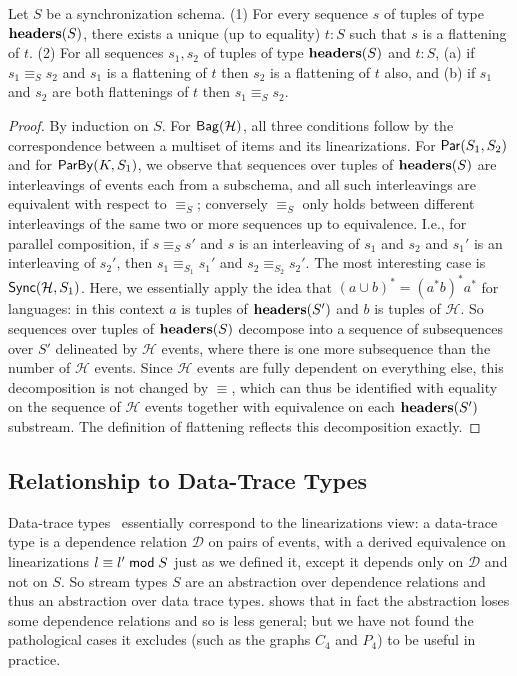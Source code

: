 \begin{proposition}
\label{45:prop:sps-sequence-correspondence}
Let $S$ be a synchronization schema.
(1) For every sequence $s$ of tuples of type $\mathbf{headers}(S)$, there exists a unique (up to equality) $t : S$ such that $s$ is a flattening of $t$.
(2) For all sequences $s_1, s_2$ of tuples of type $\mathbf{headers}(S)$ and $t : S$,
(a) if $s_1 \equiv_{S} s_2$ and $s_1$ is a flattening of  $t$ then $s_2$ is a flattening of $t$ also, and
(b) if $s_1$ and $s_2$ are both flattenings of $t$ then $s_1 \equiv_{S} s_2$.
\end{proposition}
\begin{proof}
By induction on $S$.
For $\mathsf{Bag}({\mathcal{H}})$,
all three conditions follow by the correspondence between a multiset of items and its linearizations.
For $\mathsf{Par}({S_1}, {S_2})$
and for $\mathsf{ParBy}({K}, S_1)$,
we observe that sequences over tuples of $\mathbf{headers}(S)$ are interleavings of events each from a subschema,
and all such interleavings are equivalent with respect to $\equiv_{S}$;
conversely $\equiv_{S}$ only holds between different interleavings of the same two or more sequences up to equivalence. I.e., for parallel composition, if $s \equiv_{S} s'$ and $s$ is an interleaving of $s_1$ and $s_2$ and $s_1'$ is an interleaving of $s_2'$, then $s_1 \equiv_{S_1} s_1'$ and $s_2 \equiv_{S_2} s_2'$.
The most interesting case is $\mathsf{Sync}({\mathcal{H}}, S_1)$.
Here, we essentially apply the idea that $(a \cup b)^{*} = (a^{*} b)^{*} a^{*}$ for languages: in this context $a$ is tuples of $\mathbf{headers}(S')$ and $b$ is tuples of $\mathcal{H}$.
So sequences over  tuples of $\mathbf{headers}(S)$ decompose into a sequence of subsequences over $S'$ delineated by $\mathcal{H}$ events, where there is one more subsequence than the number of $\mathcal{H}$ events.
Since $\mathcal{H}$ events are fully dependent on everything else, this decomposition is not changed by $\equiv$, which can thus be identified with equality on the sequence of $\mathcal{H}$ events together with equivalence on each $\mathbf{headers}(S')$ substream.
The definition of flattening reflects this decomposition exactly.
\end{proof}

\subsection{Relationship to Data-Trace Types}

Data-trace types~ essentially correspond to
the linearizations view: a data-trace type is a dependence relation
$\mathcal{D}$ on pairs of events,
with a derived equivalence on linearizations $l \equiv l' \;\mathsf{mod}\; {S}$
just as we defined it, except it depends only on $\mathcal{D}$ and not on
$S$.
So stream types $S$ are an abstraction over dependence relations and thus an abstraction over data trace types.
 shows that in fact the abstraction loses some dependence relations and so is less general; but we have not found the pathological cases it excludes (such as the graphs $C_4$ and $P_4$) to be useful in practice.

